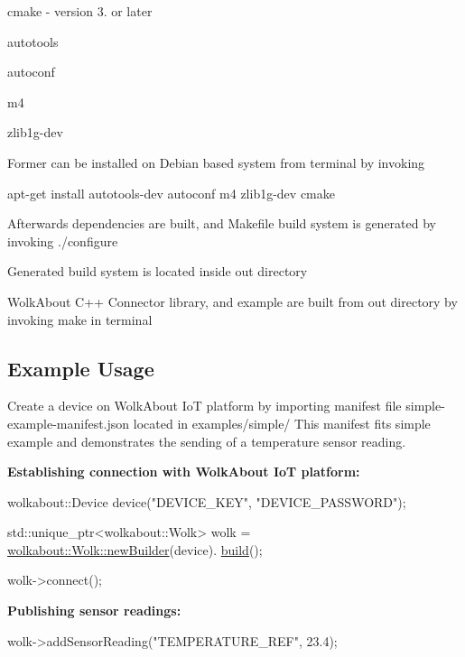 \begin{DoxyItemize}
\item cmake -\/ version 3. or later
\item autotools
\item autoconf
\item m4
\item zlib1g-\/dev
\end{DoxyItemize}

Former can be installed on Debian based system from terminal by invoking

{\ttfamily apt-\/get install autotools-\/dev autoconf m4 zlib1g-\/dev cmake}

Afterwards dependencies are built, and Makefile build system is generated by invoking {\ttfamily ./configure}

Generated build system is located inside \textquotesingle{}out\textquotesingle{} directory

Wolk\+About C++ Connector library, and example are built from \textquotesingle{}out\textquotesingle{} directory by invoking {\ttfamily make} in terminal

\subsection*{Example Usage }

Create a device on Wolk\+About IoT platform by importing manifest file {\ttfamily simple-\/example-\/manifest.\+json} located in {\ttfamily examples/simple/} This manifest fits {\ttfamily simple} example and demonstrates the sending of a temperature sensor reading.

{\bfseries Establishing connection with Wolk\+About IoT platform\+:} 
\begin{DoxyCode}
wolkabout::Device device(\textcolor{stringliteral}{"DEVICE\_KEY"}, \textcolor{stringliteral}{"DEVICE\_PASSWORD"});

std::unique\_ptr<wolkabout::Wolk> wolk = \hyperlink{classwolkabout_1_1Wolk_a91270bb8552c2dee634e552111db4bb0}{wolkabout::Wolk::newBuilder}(device).
      \hyperlink{classwolkabout_1_1WolkBuilder_aad4c9b0c925a023cf670dc2fdc6631f3}{build}();

wolk->connect();
\end{DoxyCode}


{\bfseries Publishing sensor readings\+:} 
\begin{DoxyCode}
wolk->addSensorReading(\textcolor{stringliteral}{"TEMPERATURE\_REF"}, 23.4);
\end{DoxyCode}


